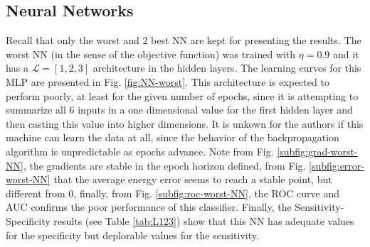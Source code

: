 \documentclass[conference]{IEEEtran}
\theoremstyle{definition}
\theoremstyle{remark}
\theoremstyle{remark}
\begin{document}
\subsection{Neural Networks}
Recall that only the worst and 2 best NN are kept for presenting the results.
The worst NN (in the sense of the objective function) was trained with
$\eta=0.9$ and it has a $\mathcal{L}=[1,2,3]$ architecture in the hidden layers.
The learning curves for this MLP are presented in Fig. \ref{fig:NN-worst}.
This architecture is expected to perform poorly, at least for the given number
of epochs, since it is attempting to summarize all 6 inputs in a one dimensional
value for the first hidden layer and then casting this value into higher
dimensions. It is unkown for the authors if this machine can learn the data at
all, since the behavior of the backpropagation algorithm is unpredictable as
epochs advance. Note from Fig. \ref{subfig:grad-worst-NN}, the gradients are
stable in the epoch horizon defined, from Fig. \ref{subfig:error-worst-NN} that
the average energy error seems to reach a stable point, but different from 0,
finally, from Fig. \ref{subfig:roc-worst-NN}, the ROC curve and AUC confirms the
poor performance of this classifier. Finally, the Sensitivity-Specificity
results (see Table \ref{tab:L123}) show that this NN has adequate values for the
specificity but deplorable values for the sensitivity.
\end{document}
